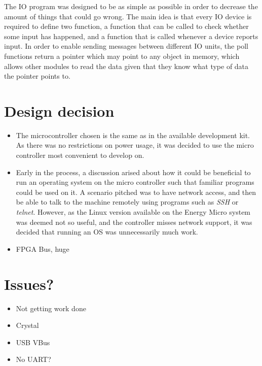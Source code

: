 The IO program was designed to be as simple as possible in order to decrease the amount of things that could go wrong.
The main idea is that every IO device is required to define two function, a function that can be called to check whether some input has happened, and a function that is called whenever a device reports input.
In order to enable sending messages between different IO units, the poll functions return a pointer which may point to any object in memory, which allows other modules to read the data given that they know what type of data the pointer points to.

\section{Design decision}
\begin{itemize}
    \item The microcontroller chosen is the same as in the available development kit. As there was no restrictions on power usage, 
          it was decided to use the micro controller most convenient to develop on.
    \item Early in the process, a discussion arised about how it could be beneficial to run an operating system on the micro controller
          such that familiar programs could be used on it. A scenario pitched was to have network access, and then be able to talk to the
          machine remotely using programs such as \textit{SSH} or \textit{telnet}. However, as the Linux version available on the Energy Micro
          system was deemed not so useful, and the controller misses network support, it was decided that running an OS was unnecessarily much work.
    \item FPGA Bus, huge
\end{itemize}

\section{Issues?}
\begin{itemize}
    \item Not getting work done
    \item Crystal
    \item USB VBus
    \item No UART?
\end{itemize}

